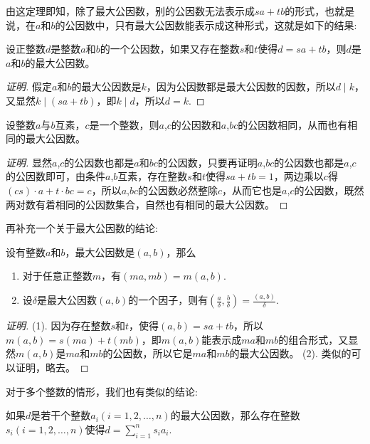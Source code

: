 由这定理即知，除了最大公因数，别的公因数无法表示成$sa+tb$的形式，也就是说，在$a$和$b$的公因数中，只有最大公因数能表示成这种形式，这就是如下的结果:
\begin{theorem}
  设正整数$d$是整数$a$和$b$的一个公因数，如果又存在整数$s$和$t$使得$d=sa+tb$，则$d$是$a$和$b$的最大公因数。
\end{theorem}

\begin{proof}[证明]
  假定$a$和$b$的最大公因数是$k$，因为公因数都是最大公因数的因数，所以$d \mid k$，又显然$k \mid (sa+tb)$，即$k \mid d$，所以$d=k$.
\end{proof}

\begin{theorem}
  设整数$a$与$b$互素，$c$是一个整数，则$a$,$c$的公因数和$a$,$bc$的公因数相同，从而也有相同的最大公因数。
\end{theorem}

\begin{proof}[证明]
  显然$a$,$c$的公因数也都是$a$和$bc$的公因数，只要再证明$a$,$bc$的公因数也都是$a$,$c$的公因数即可，由条件$a$,$b$互素，存在整数$s$和$t$使得$sa+tb=1$，两边乘以$c$得$(cs)\cdot a+t\cdot bc=c$，所以$a$,$bc$的公因数必然整除$c$，从而它也是$a$,$c$的公因数，既然两对数有着相同的公因数集合，自然也有相同的最大公因数。
\end{proof}

再补充一个关于最大公因数的结论:
\begin{theorem}
  设有整数$a$和$b$，最大公因数是$(a,b)$，那么
  \begin{enumerate}
  \item 对于任意正整数$m$，有$(ma, mb)=m(a,b)$.
  \item 设$\delta$是最大公因数$(a,b)$的一个因子，则有$(\frac{a}{\delta}, \frac{b}{\delta})=\frac{(a,b)}{\delta}$.
  \end{enumerate}
\end{theorem}

\begin{proof}[证明]
  (1). 因为存在整数$s$和$t$，使得$(a,b)=sa+tb$，所以$m(a,b)=s(ma)+t(mb)$，即$m(a,b)$能表示成$ma$和$mb$的组合形式，又显然$m(a,b)$是$ma$和$mb$的公因数，所以它是$ma$和$mb$的最大公因数。
  (2). 类似的可以证明，略去。
\end{proof}

对于多个整数的情形，我们也有类似的结论:
\begin{theorem}
  如果$d$是若干个整数$a_i(i=1,2,\ldots,n)$的最大公因数，那么存在整数$s_i(i=1,2,\ldots,n)$使得$d=\sum_{i=1}^n s_ia_i$.
\end{theorem}

